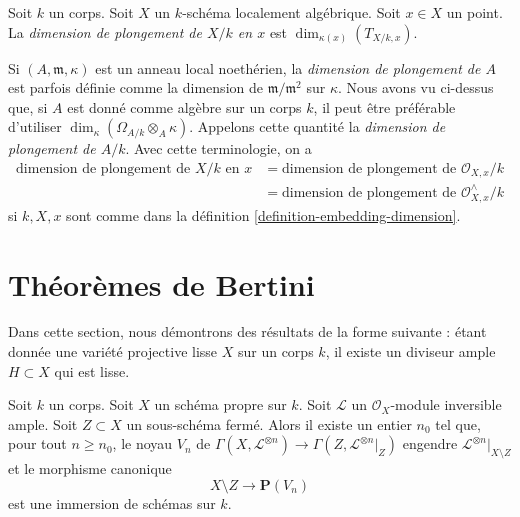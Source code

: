 \begin{definition}
\label{definition-embedding-dimension}
Soit $k$ un corps. Soit $X$ un $k$-schéma localement algébrique.
Soit $x \in X$ un point. La {\it dimension de plongement de $X/k$ en $x$}
est $\dim_{\kappa(x)}(T_{X/k, x})$.
\end{definition}

\noindent
Si $(A, \mathfrak m, \kappa)$ est un anneau local noethérien,
la {\it dimension de plongement de $A$} est parfois définie comme la dimension de
$\mathfrak m/\mathfrak m^2$ sur $\kappa$. Nous avons vu ci-dessus que,
si $A$ est donné comme algèbre sur un corps $k$, il peut être préférable
d'utiliser $\dim_\kappa(\Omega_{A/k} \otimes_A \kappa)$. Appelons
cette quantité la {\it dimension de plongement de $A/k$}.
Avec cette terminologie, on a
$$
\begin{aligned}
\text{dimension de plongement de }X/k\text{ en }x
&= \text{dimension de plongement de }\mathcal{O}_{X, x}/k \\
&= \text{dimension de plongement de }\mathcal{O}_{X, x}^\wedge/k
\end{aligned}
$$
si $k, X, x$ sont comme dans la définition \ref{definition-embedding-dimension}.






\section{Théorèmes de Bertini}
\label{section-bertini}

\noindent
Dans cette section, nous démontrons des résultats de la forme suivante : étant donnée une variété
projective lisse $X$ sur un corps $k$, il existe un diviseur ample $H \subset X$
qui est lisse.

\begin{lemma}
\label{lemma-generate-over-complement}
Soit $k$ un corps. Soit $X$ un schéma propre sur $k$. Soit $\mathcal{L}$
un $\mathcal{O}_X$-module inversible ample. Soit $Z \subset X$ un
sous-schéma fermé. Alors il existe un entier $n_0$ tel que, pour tout
$n \geq n_0$, le noyau $V_n$ de
$\Gamma(X, \mathcal{L}^{\otimes n}) \to \Gamma(Z, \mathcal{L}^{\otimes n}|_Z)$
engendre $\mathcal{L}^{\otimes n}|_{X \setminus Z}$ et
le morphisme canonique
$$
X \setminus Z \longrightarrow \mathbf{P}(V_n)
$$
est une immersion de schémas sur $k$.
\end{lemma}

